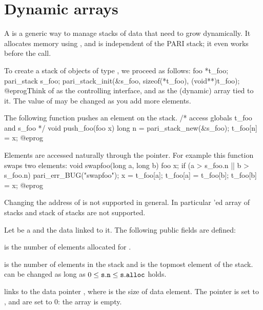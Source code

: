 
\section{Dynamic arrays}

A  is a generic way to manage stacks of data that need
to grow dynamically. It allocates memory using , and is
independent of the PARI stack; it even works before the  call.


To create a stack of objects of type , we proceed as follows:
\bprog
foo *t_foo;
pari_stack s_foo;
pari_stack_init(&s_foo, sizeof(*t_foo), (void**)t_foo);
@eprog\noindent Think of  as the controlling interface, and
 as the (dynamic) array tied to it. The value of 
may be changed as you add more elements.

The following function pushes an element on the stack.
\bprog
/* access globals t_foo and s_foo */
void push_foo(foo x)
{
  long n = pari_stack_new(&s_foo);
  t_foo[n] = x;
}
@eprog


Elements are accessed naturally through the  pointer.
For example this function swaps two elements:
\bprog
void swapfoo(long a, long b)
{
  foo x;
  if (a > s_foo.n || b > s_foo.n) pari_err_BUG("swapfoo");
  x        = t_foo[a];
  t_foo[a] = t_foo[b];
  t_foo[b] = x;
}
@eprog

Changing the address of  is not supported in general.
In particular 'ed array of stacks and stack of stacks are not
supported.

Let  be a  and  the data linked to it. The
following public fields are defined:

\item {} is the number of elements allocated for .

\item {} is the number of elements in the stack and  is
the topmost element of the stack.   can be changed as long as
$0\leq{\tt s.n}\leq{\tt s.alloc}$ holds.

 links
 to the data pointer , where  is the size of
data element. The pointer  is set to ,  and
 are set to $0$: the array is empty.

